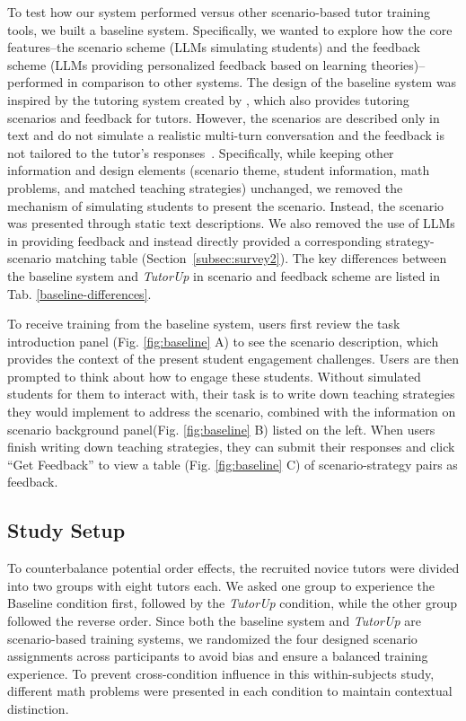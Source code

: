 To test how our system performed versus other scenario-based tutor training tools, we built a baseline system. Specifically, we wanted to explore how the core features--the scenario scheme (LLMs simulating students) and the feedback scheme (LLMs providing personalized feedback based on learning theories)--performed in comparison to other systems. The design of the baseline system was inspired by the tutoring system created by \citet{personalizedlearning}, which also provides tutoring scenarios and feedback for tutors. However, the scenarios are described only in text and do not simulate a realistic multi-turn conversation and the feedback is not tailored to the tutor's responses~\cite{developmentofscenario, whenthetutorbecomes}. Specifically, while keeping other information and design elements (scenario theme, student information, math problems, and matched teaching strategies) unchanged, we removed the mechanism of simulating students to present the scenario. Instead, the scenario was presented through static text descriptions. We also removed the use of LLMs in providing feedback and instead directly provided a corresponding strategy-scenario matching table (Section~\ref{subsec:survey2}). The key differences between the baseline system and \textit{TutorUp} in scenario and feedback scheme are listed in Tab. \ref{baseline-differences}.

To receive training from the baseline system, users first review the task introduction panel (Fig. \ref{fig:baseline} A) to see the scenario description, which provides the context of the present student engagement challenges. Users are then prompted to think about how to engage these students. Without simulated students for them to interact with, their task is to write down teaching strategies they would implement to address the scenario, combined with the information on scenario background panel(Fig. \ref{fig:baseline} B) listed on the left. When users finish writing down teaching strategies, they can submit their responses and click ``Get Feedback'' to view a table (Fig. \ref{fig:baseline} C) of scenario-strategy pairs as feedback. 




\subsection{Study Setup}
\label{subsec:setup}
To counterbalance potential order effects, the recruited novice tutors were divided into two groups with eight tutors each. We asked one group to experience the Baseline condition first, followed by the \textit{TutorUp} condition, while the other group followed the reverse order. Since both the baseline system and \textit{TutorUp} are scenario-based training systems, we randomized the four designed scenario assignments across participants to avoid bias and ensure a balanced training experience. To prevent cross-condition influence in this within-subjects study, different math problems were presented in each condition to maintain contextual distinction. 

